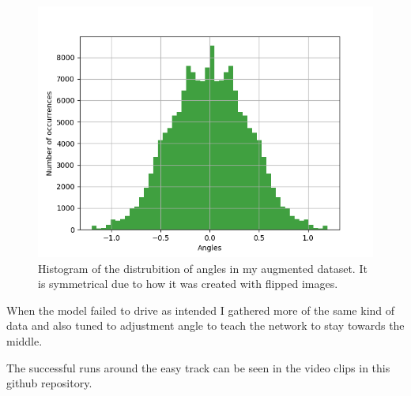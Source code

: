 \documentclass[12pt,a4paper]{article}
\begin{document}
\begin{figure}
	\centering
	\includegraphics[scale=1]{histogram.png}
	\caption{Histogram of the distrubition of angles in my augmented dataset. It is symmetrical due to how it was created with flipped images.}
\label{histogram}
\end{figure}

When the model failed to drive as intended I gathered more of the same kind of data and also tuned to adjustment angle to teach the network to stay towards the middle.

The successful runs around the easy track can be seen in the video clips in this github repository.

{}

\end{document}
